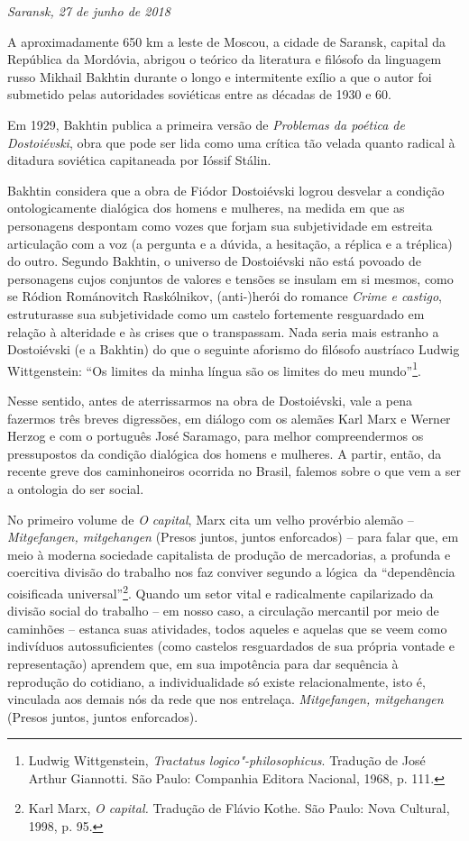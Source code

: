\begin{flushright}
\emph{Saransk, 27 de junho de 2018}
\end{flushright}

A aproximadamente 650 km a leste de Moscou, a cidade de Saransk, capital
da República da Mordóvia, abrigou o teórico da literatura e filósofo da
linguagem russo Mikhail Bakhtin durante o longo e intermitente exílio a
que o autor foi submetido pelas autoridades soviéticas entre as décadas
de 1930 e 60.

Em 1929, Bakhtin publica a primeira versão de \emph{Problemas da poética
de Dostoiévski}, obra que pode ser lida como uma crítica tão velada
quanto radical à ditadura soviética capitaneada por Ióssif Stálin.

Bakhtin considera que a obra de Fiódor Dostoiévski logrou desvelar a
condição ontologicamente dialógica dos homens e mulheres, na medida em
que as personagens despontam como vozes que forjam sua subjetividade em
estreita articulação com a voz (a pergunta e a dúvida, a hesitação, a
réplica e a tréplica) do outro. Segundo Bakhtin, o universo de
Dostoiévski não está povoado de personagens cujos conjuntos de valores e
tensões se insulam em si mesmos, como se Ródion Románovitch Raskólnikov,
(anti-)herói do romance \emph{Crime e castigo}, estruturasse sua
subjetividade como um castelo fortemente resguardado em relação à
alteridade e às crises que o transpassam. Nada seria mais estranho a
Dostoiévski (e a Bakhtin) do que o seguinte aforismo do filósofo
austríaco Ludwig Wittgenstein: ``Os limites da minha língua são os
limites do meu mundo''\footnote{Ludwig Wittgenstein, \emph{Tractatus
  logico"-philosophicus}. Tradução de José Arthur Giannotti. São Paulo:
  Companhia Editora Nacional, 1968, p. 111.}.

Nesse sentido, antes de aterrissarmos na obra de Dostoiévski, vale a
pena fazermos três breves digressões, em diálogo com os alemães Karl
Marx e Werner Herzog e com o português José Saramago, para melhor
compreendermos os pressupostos da condição dialógica dos homens e
mulheres. A partir, então, da recente greve dos caminhoneiros ocorrida
no Brasil, falemos sobre o que vem a ser a ontologia do ser social.

No primeiro volume de \emph{O capital}, Marx cita um velho provérbio
alemão --\emph{Mitgefangen, mitgehangen} (Presos juntos, juntos
enforcados) -- para falar que, em meio à moderna sociedade capitalista
de produção de mercadorias, a profunda e coercitiva divisão do trabalho
nos faz conviver segundo a lógica~da ``dependência coisificada
universal''\footnote{Karl Marx, \emph{O capital.} Tradução de Flávio
  Kothe. São Paulo: Nova Cultural, 1998, p. 95.}. Quando um setor vital
e radicalmente capilarizado da divisão social do trabalho -- em nosso
caso, a circulação mercantil por meio de caminhões -- estanca suas
atividades, todos aqueles e aquelas que se veem como indivíduos
autossuficientes (como castelos resguardados de sua própria vontade e
representação) aprendem que, em sua impotência para dar sequência à
reprodução do cotidiano, a individualidade só existe relacionalmente,
isto é, vinculada aos demais nós da rede que nos entrelaça.
\emph{Mitgefangen, mitgehangen} (Presos juntos, juntos enforcados).

